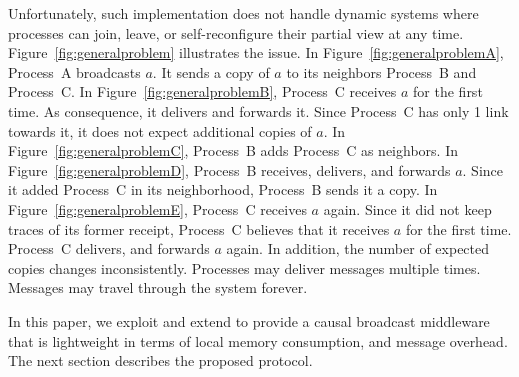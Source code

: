 Unfortunately, such implementation does not handle dynamic systems where
processes can join, leave, or self-reconfigure their partial view at any
time. Figure~\ref{fig:generalproblem} illustrates the issue. In
Figure~\ref{fig:generalproblemA}, Process~A broadcasts $a$. It sends a copy of
$a$ to its neighbors Process~B and Process~C. In
Figure~\ref{fig:generalproblemB}, Process~C receives $a$ for the first time.  As
consequence, it delivers and forwards it. Since Process~C has only 1 link
towards it, it does not expect additional copies of $a$. In
Figure~\ref{fig:generalproblemC}, Process~B adds Process~C as neighbors. In
Figure~\ref{fig:generalproblemD}, Process~B receives, delivers, and forwards
$a$. Since it added Process~C in its neighborhood, Process~B sends it a copy.
In Figure~\ref{fig:generalproblemE}, Process~C receives $a$ again. Since it did
not keep traces of its former receipt, Process~C believes that it receives $a$
for the first time. Process~C delivers, and forwards $a$ again. In addition, the
number of expected copies changes inconsistently. Processes may deliver messages
multiple times. Messages may travel through the system forever.



In this paper, we exploit and extend \PCBROADCAST to provide a causal broadcast
middleware that is lightweight in terms of local memory consumption, and message
overhead.  The next section describes the proposed
protocol.

